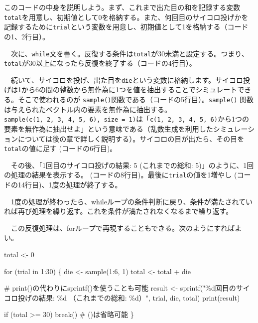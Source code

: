 \documentclass[
  a4paper,
  pandoc,
  ja=standard,
  jafont=haranoaji]{bxjsbook}
\newenvironment{Shaded}{\begin{snugshade}}{\end{snugshade}}
\newcommand{\CommentTok}[1]{\textcolor[rgb]{0.37,0.37,0.37}{#1}}
\newcommand{\ControlFlowTok}[1]{\textcolor[rgb]{0.00,0.48,0.65}{#1}}
\newcommand{\DecValTok}[1]{\textcolor[rgb]{0.68,0.00,0.00}{#1}}
\newcommand{\FunctionTok}[1]{\textcolor[rgb]{0.28,0.35,0.67}{#1}}
\newcommand{\NormalTok}[1]{\textcolor[rgb]{0.00,0.48,0.65}{#1}}
\newcommand{\OtherTok}[1]{\textcolor[rgb]{0.00,0.48,0.65}{#1}}
\newcommand{\SpecialCharTok}[1]{\textcolor[rgb]{0.37,0.37,0.37}{#1}}
\newcommand{\StringTok}[1]{\textcolor[rgb]{0.13,0.47,0.30}{#1}}
\begin{document}
このコードの中身を説明しよう。まず、これまで出た目の和を記録する変数\texttt{total}を用意し、初期値として0を格納する。また、何回目のサイコロ投げかを記録するために\texttt{trial}という変数を用意し、初期値として1を格納する（コードの1、2行目）。

　次に、\texttt{while}文を書く。反復する条件は\texttt{total}が30未満と設定する。つまり、\texttt{total}が30以上になったら反復を終了する（コードの4行目）。

　続いて、サイコロを投げ、出た目を\texttt{die}という変数に格納します。サイコロ投げは1から6の間の整数から無作為に1つを値を抽出することでシミュレートできる。そこで使われるのが
\texttt{sample()}関数である（コードの5行目）。\texttt{sample()}
関数は与えられたベクトル内の要素を無作為に抽出する。\texttt{sample(c(1,\ 2,\ 3,\ 4,\ 5,\ 6),\ size\ =\ 1)}は「\texttt{c(1,\ 2,\ 3,\ 4,\ 5,\ 6)}から1つの要素を無作為に抽出せよ」という意味である（乱数生成を利用したシミュレーションについては後の章で詳しく説明する）。サイコロの目が出たら、その目を\texttt{total}の値に足す
(コードの6行目)。

　その後、「1回目のサイコロ投げの結果: 5 (これまでの総和:
5)」のように、1回の処理の結果を表示する。
(コードの8行目)。最後に\texttt{trial}の値を1増やし
(コードの14行目)、1度の処理が終了する。

　1度の処理が終わったら、whileループの条件判断に戻り、条件が満たされていれば再び処理を繰り返す。これを条件が満たされなくなるまで繰り返す。

　この反復処理は、forループで再現することもできる。次のようにすればよい。

\begin{Shaded}
\begin{Highlighting}[numbers=left,,]
\NormalTok{total }\OtherTok{\textless{}{-}} \DecValTok{0}

\ControlFlowTok{for}\NormalTok{ (trial }\ControlFlowTok{in} \DecValTok{1}\SpecialCharTok{:}\DecValTok{30}\NormalTok{) \{}
\NormalTok{  die  }\OtherTok{\textless{}{-}} \FunctionTok{sample}\NormalTok{(}\DecValTok{1}\SpecialCharTok{:}\DecValTok{6}\NormalTok{, }\DecValTok{1}\NormalTok{)}
\NormalTok{  total }\OtherTok{\textless{}{-}}\NormalTok{ total }\SpecialCharTok{+}\NormalTok{ die}
  
  \CommentTok{\# print()の代わりにsprintf()を使うことも可能}
\NormalTok{  result }\OtherTok{\textless{}{-}} \FunctionTok{sprintf}\NormalTok{(}\StringTok{"\%d回目のサイコロ投げの結果: \%d （これまでの総和: \%d）"}\NormalTok{,}
\NormalTok{                    trial, die, total)}
  \FunctionTok{print}\NormalTok{(result)}
  
  \ControlFlowTok{if}\NormalTok{ (total }\SpecialCharTok{\textgreater{}=} \DecValTok{30}\NormalTok{)  }\ControlFlowTok{break}\NormalTok{() }\CommentTok{\# ()は省略可能}
\NormalTok{\}}
\end{Highlighting}
\end{Shaded}
\end{document}
